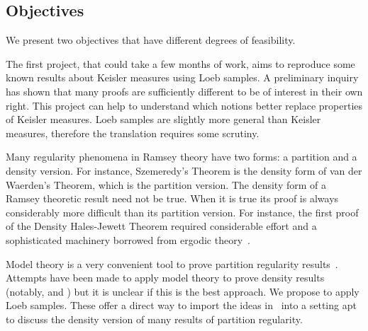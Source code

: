 \documentclass[10pt]{article}
\begin{document}
\subsection{Objectives}
We present two objectives that have different degrees of feasibility.

The first project, that could take a few months of work, aims to reproduce some known results about Keisler measures using Loeb samples.
A preliminary inquiry has shown that many proofs are sufficiently different to be of interest in their own right.
This project can help to understand which notions better replace properties of Keisler measures.
Loeb samples are slightly more general than Keisler measures, therefore the translation requires some scrutiny.

Many regularity phenomena in Ramsey theory have two forms: a partition and a density version.
For instance, Szemeredy's Theorem is the density form of van der Waerden's Theorem, which is the partition version.
The density form of a Ramsey theoretic result need not be true.
When it is true its proof is always considerably more difficult than its partition version.
For instance, the first proof of the Density Hales-Jewett Theorem required considerable effort and a sophisticated machinery borrowed from ergodic theory~\cite{MR1191743}.

Model theory is a very convenient tool to prove partition regularity results~\cite{arXiv:1901.04363}.
Attempts have been made to apply model theory to prove density results (notably, \cite{arXiv:1002.4456} and \cite{MR3219561}) but it is unclear if this is the best approach.
We propose to apply Loeb samples. 
These offer a direct way to import the ideas in~\cite{arXiv:1901.04363} into a setting apt to discuss the density version of many results of partition regularity.
\end{document}
